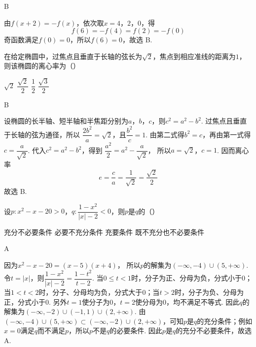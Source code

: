 \begin{answer}
B
\end{answer}

\begin{solution}
由\(f(x+2)=-f(x)\)，依次取\(x=4\)，\(2\)，\(0\)，得
\[
f(6)=-f(4)=f(2)=-f(0)
\]
奇函数满足\(f(0)=0\)，所以\(f(6)=0\)，故选 B.
\end{solution}

\begin{problem}
在给定椭圆中，过焦点且垂直于长轴的弦长为\(\sqrt{2}\)，焦点到相应准线的距离为\(1\)，则该椭圆的离心率为（\quad）

\choices
    {\(\sqrt{2}\)}
    {\(\dfrac{\sqrt{2}}{2}\)}
    {\(\dfrac{1}{2}\)}
    {\(\dfrac{\sqrt{3}}{2}\)}
\end{problem}

\begin{answer}
B
\end{answer}

\begin{solution}
设椭圆的长半轴、短半轴和半焦距分别为\(a\)，\(b\)，\(c\)，则\(c^2=a^2-b^2\). 过焦点且垂直于长轴的弦为通径，所以
\(\dfrac{2b^2}{a}=\sqrt{2}\)，且\(\dfrac{b^2}{c}=1\).
由第二式得\(b^2=c\)，再由第一式得\(c=\dfrac{a}{\sqrt{2}}\). 代入\(c^2=a^2-b^2\)，得到
\(\dfrac{a^2}{2}=a^2-\dfrac{a}{\sqrt{2}}\)，
所以\(a=\sqrt{2}\)，\(c=1\). 因而离心率
\[
e=\frac{c}{a}=\frac{1}{\sqrt{2}}=\frac{\sqrt{2}}{2}
\]
故选 B.
\end{solution}

\begin{problem}
设\(p:x^2-x-20>0\)，\(q:\dfrac{1-x^2}{|x|-2}<0\)，则\(p\)是\(q\)的（\quad）

\choices
    {充分不必要条件}
    {必要不充分条件}
    {充要条件}
    {既不充分也不必要条件}
\end{problem}

\begin{answer}
A
\end{answer}

\begin{solution}
因为\(x^2-x-20=(x-5)(x+4)\)，
所以\(p\)的解集为\((-\infty,-4)\cup(5,+\infty)\). 令\(t=|x|\)，则\(\dfrac{1-x^2}{|x|-2}=\dfrac{1-t^2}{t-2}\).
当\(0\leqslant t<1\)时，分子为正、分母为负，分式小于\(0\)；当\(1<t<2\)时，分子、分母均为负，分式大于\(0\)；当\(t>2\)时，分子为负、分母为正，分式小于\(0\). 另外\(t=1\)使分子为\(0\)，\(t=2\)使分母为\(0\)，均不满足不等式. 因此\(q\)的解集为\((-\infty,-2)\cup(-1,1)\cup(2,+\infty)\).
由\((-\infty,-4)\cup(5,+\infty)\subset(-\infty,-2)\cup(2,+\infty)\)，可知\(p\)是\(q\)的充分条件；例如\(x=0\)满足\(q\)而不满足\(p\)，所以\(p\)不是\(q\)的必要条件. 因此\(p\)是\(q\)的充分不必要条件，故选 A.
\end{solution}

